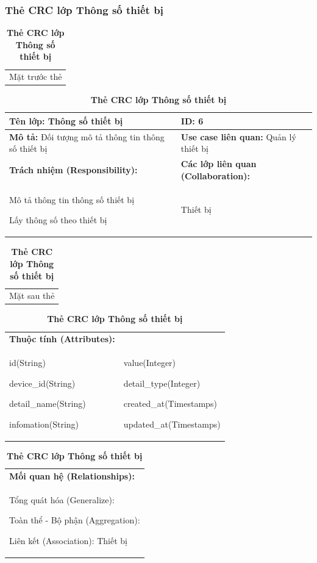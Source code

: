   \subsubsection{Thẻ CRC lớp Thông số thiết bị}
  \begin{table}[H]
    \caption{\bfseries \fontsize{12pt}{0pt}\selectfont Thẻ CRC lớp Thông số thiết bị}
    \centering
    \begin{tabularx}{0.9\textwidth}{X}
      Mặt trước thẻ
    \end{tabularx}
    \begin{tabularx}{0.9\textwidth}{|X|X|}
      \hline
      \textbf{Tên lớp:} Thông số thiết bị & \textbf{ID:} 6 \\
      \hline
      \textbf{Mô tả:} Đối tượng mô tả thông tin thông số thiết bị & \textbf{Use case liên quan:} Quản lý thiết bị\\
      \hline
      \textbf{Trách nhiệm (Responsibility):} & \textbf{Các lớp liên quan (Collaboration):} \\
      Mô tả thông tin thông số thiết bị

      Lấy thông số theo thiết bị
      & 
      Thiết bị 
      \\
      \hline
    \end{tabularx}
    \begin{tabularx}{0.9\textwidth}{X}
      Mặt sau thẻ
    \end{tabularx}
    \begin{tabularx}{0.9\textwidth}{|X|X|}
      \hline
      \textbf{Thuộc tính (Attributes):} & \\
      id(String) 
      
      device\_id(String)

      detail\_name(String)

      infomation(String)
      & 
      value(Integer)

      detail\_type(Integer)
      
      created\_at(Timestamps)

      updated\_at(Timestamps)
      \\
      \hline
    \end{tabularx}
    \begin{tabularx}{0.9\textwidth}{|X|}
      \textbf{Mối quan hệ (Relationships):} \\
      Tổng quát hóa (Generalize):  

      Toàn thể - Bộ phận (Aggregation): 
      
      Liên kết (Association): Thiết bị
      \\
      \hline
    \end{tabularx}
  \end{table}

